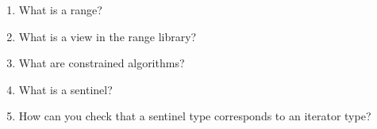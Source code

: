 \begin{enumerate}
\item
What is a range?

\item
What is a view in the range library?

\item
What are constrained algorithms?

\item
What is a sentinel?

\item
How can you check that a sentinel type corresponds to an iterator type?
\end{enumerate}